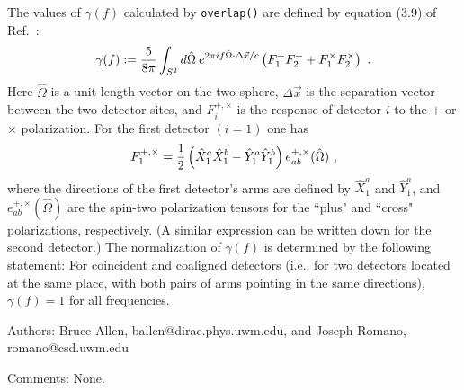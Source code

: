 The values of $\gamma(f)$ calculated by {\tt overlap()} are defined by 
equation (3.9) of Ref.~\cite{AllenReview}:
%
\begin{equation}
\label{e:overlap}
\gamma(f) := {5 \over 8 \pi} \int_{S^2} d \hat \Omega \>
e^{2 \pi i f \hat \Omega \cdot \Delta \vec x/c }
\left( F_1^+ F_2^+ + F_1^\times F_2^\times \right)\ .
\end{equation}
%
Here $\hat \Omega$ is a unit-length vector on the two-sphere, $\Delta
\vec x$ is the separation vector between the two detector sites, and
$F_i^{+,\times}$ is the response of detector $i$ to the $+$ or $\times$
polarization.  
For the first detector $(i=1)$ one has
%
\begin{equation}
\label{e:detectresponse}
F_1^{+,\times} = {1 \over 2} \left( \hat X_1^a \hat X_1^b - 
\hat Y_1^a \hat Y_1^b \right)e_{ab}^{+,\times}(\hat \Omega)\ ,
\end{equation}
%
where the directions of the first detector's arms are defined by 
$\hat X_1^a$ and $\hat Y_1^a$, and $e_{ab}^{+,\times}(\hat \Omega)$ are 
the spin-two polarization tensors for the ``plus" and ``cross" 
polarizations, respectively.  
(A similar expression can be written down for the second detector.)
The normalization of $\gamma(f)$ is determined by the following statement:  
For coincident and coaligned detectors (i.e., for two detectors located 
at the same place, with both pairs of arms pointing in the same directions),
$\gamma(f)=1$ for all frequencies.
%
\begin{description}
\item{Authors:}
Bruce Allen, ballen@dirac.phys.uwm.edu, and Joseph Romano, romano@csd.uwm.edu
\item{Comments:}
None.
\end{description}
\clearpage



